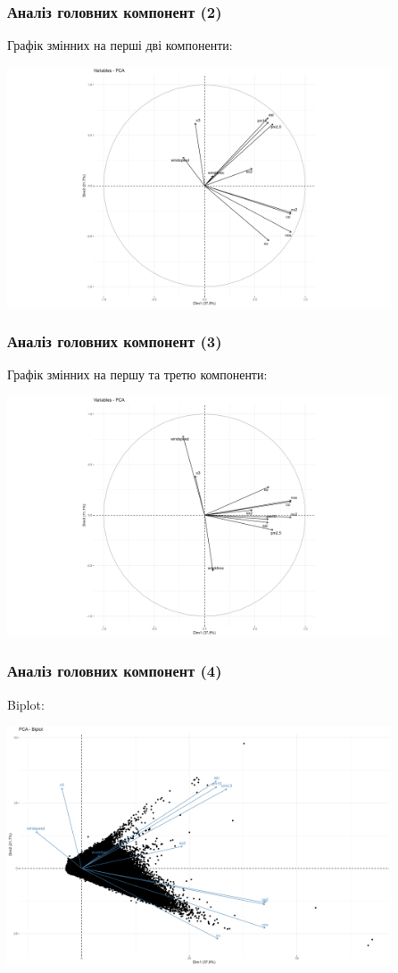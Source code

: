 \documentclass{beamer}
\begin{document}
\begin{frame}
\frametitle{Аналіз головних компонент (2)}
  Графік змінних на перші дві компоненти:

  \includegraphics[height=2.8in]{plots/lab4/pca/projection-1-2.png}
\end{frame}

\begin{frame}
\frametitle{Аналіз головних компонент (3)}
  Графік змінних на першу та третю компоненти:

  \includegraphics[height=2.8in]{plots/lab4/pca/projection-1-3.png}
\end{frame}

\begin{frame}
\frametitle{Аналіз головних компонент (4)}
  Biplot:

  \includegraphics[height=2.8in]{plots/lab4/pca/biplot.png}
\end{frame}
\end{document}
